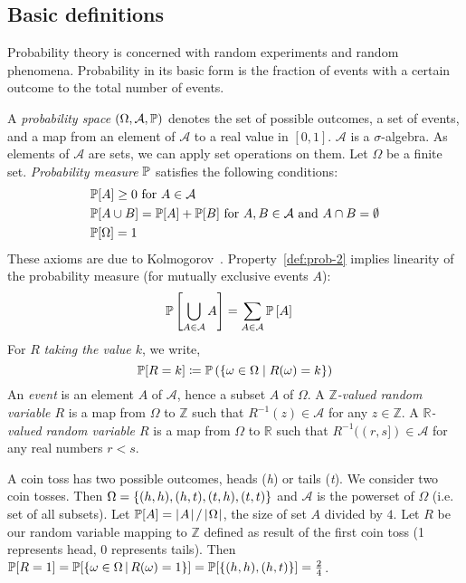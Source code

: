 \subsection{Basic definitions}
\label{sec:bp-def}
%
Probability theory is concerned with random experiments and random phenomena. Probability in its basic form is the fraction of events with a certain outcome to the total number of events.
%
\begin{definition}
  \label{def:prob}
  A \emph{probability space} $(\Omega, \mathcal A, \mathbb P)$ denotes
    the set of possible outcomes, a set of events, and a map from an element of $\mathcal A$ to a real value in $[0,1]$.
    $\mathcal A$ is a $\sigma$-algebra. As elements of $\mathcal A$ are sets, we can apply set operations on them.
    Let $\Omega$ be a finite set.
    \emph{Probability measure} $\mathbb P$ satisfies the following conditions:
    \begin{align}
      &\mathbb P[A] \geq 0 \text{ for } A \in \mathcal A \label{def:prob-1} \\
      &\mathbb P[A \cup B] = \mathbb P[A] + \mathbb P[B] \text{ for } A, B \in \mathcal A \text{ and } A \cap B = \emptyset \label{def:prob-2} \\
      &\mathbb P[\Omega] = 1 \label{def:prob-3}
    \end{align}
    These axioms are due to Kolmogorov~\cite{kolmogorov1950foundations}.
    Property~\ref{def:prob-2} implies linearity of the probability measure (for mutually exclusive events $A$):
    \begin{align}
      \mathbb P\left[\bigcup_{A \in \mathcal A} A\right] &= \sum_{A \in \mathcal A} \mathbb P\left[A\right] \label{eq:prob-linear}
    \end{align}
  For $R$ \emph{taking the value $k$}, we write,
  \[ \mathbb P[R=k] \coloneqq \mathbb P\left(\left\{\omega \in \Omega \mid R(\omega) = k\right\}\right) \]
  An \emph{event} is an element $A$ of $\mathcal A$, hence a subset $A$ of $\Omega$.
  A \emph{$\mathbb Z$-valued random variable $R$} is a map from $\Omega$ to $\mathbb Z$
  such that $R^{-1}(z) \in \mathcal A$ for any $z \in \mathbb Z$.
  A \emph{$\mathbb R$-valued random variable $R$} is a map from $\Omega$ to $\mathbb R$
  such that $R^{-1}((r, s]) \in \mathcal A$ for any real numbers $r < s$.
\end{definition}
\begin{example}
  \label{ex:cointoss}
  A coin toss has two possible outcomes, heads (\textit h) or tails (\textit t).
  We consider two coin tosses.
  Then $\Omega = \left\{(h, h), (h, t), (t, h), (t, t)\right\}$ and $\mathcal A$ is the powerset of $\Omega$ (i.e. set of all subsets).
  Let $\mathbb P[A] = \left|\hskip .06667em A\hskip .06667em \right| / \left|\hskip .06667em \Omega\hskip .06667em \right|$, the size of set $A$ divided by $4$.
  Let $R$ be our random variable mapping to $\mathbb Z$ defined as result of the first coin toss (1 represents head, 0 represents tails).
  Then $\mathbb P[R=1] = \mathbb P[\left\{\omega \in \Omega\,|\,R(\omega) = 1\right\}] = \mathbb P[\left\{(h, h), (h, t)\right\}] = \frac24$.
\end{example}

